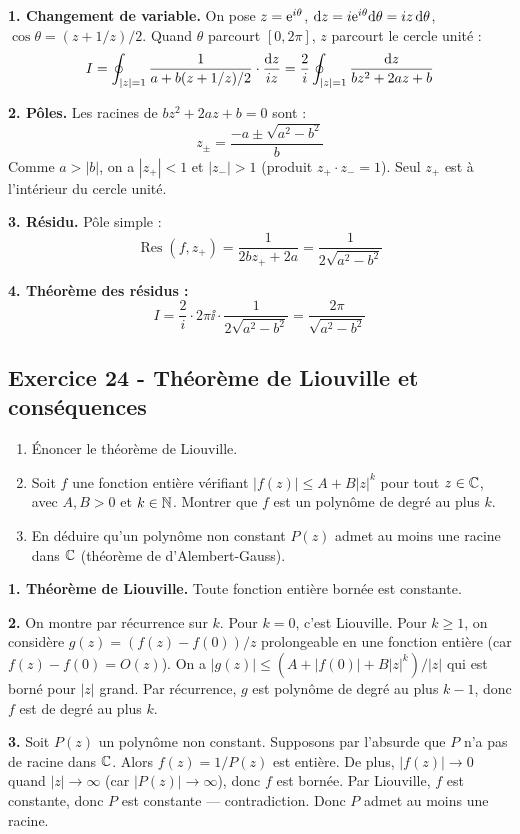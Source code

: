 \documentclass[12pt,a4paper]{article}
\begin{document}
\begin{boitecorrige}
\textbf{1. Changement de variable.} On pose $z = \mathrm{e}^{i\theta}$, $\mathrm{d} z = i\mathrm{e}^{i\theta}\mathrm{d}\theta = iz\,\mathrm{d}\theta$, $\cos\theta = (z+1/z)/2$. Quand $\theta$ parcourt $[0,2\pi]$, $z$ parcourt le cercle unité :
\[
I = \oint_{|z|=1}\frac{1}{a + b(z+1/z)/2}\cdot\frac{\mathrm{d} z}{iz} = \frac{2}{i}\oint_{|z|=1}\frac{\mathrm{d} z}{bz^2+2az+b}
\]

\textbf{2. Pôles.} Les racines de $bz^2+2az+b=0$ sont :
\[
z_\pm = \frac{-a\pm\sqrt{a^2-b^2}}{b}
\]
Comme $a>|b|$, on a $|z_+| < 1$ et $|z_-| > 1$ (produit $z_+\cdot z_- = 1$). Seul $z_+$ est à l'intérieur du cercle unité.

\textbf{3. Résidu.} Pôle simple :
\[
\operatorname{Res}(f, z_+) = \frac{1}{2bz_+ + 2a} = \frac{1}{2\sqrt{a^2-b^2}}
\]

\textbf{4. Théorème des résidus :}
\[
I = \frac{2}{i}\cdot 2\pi\ii \cdot \frac{1}{2\sqrt{a^2-b^2}} = \frac{2\pi}{\sqrt{a^2-b^2}}
\]
\end{boitecorrige}

\subsection*{Exercice 24 - Théorème de Liouville et conséquences \niveau{\moyen}}

\begin{boiteexercice}
\begin{enumerate}
  \item Énoncer le théorème de Liouville.
  \item Soit $f$ une fonction entière vérifiant $|f(z)|\leq A + B|z|^k$ pour tout $z\in\mathbb{C}$, avec $A,B>0$ et $k\in\mathbb{N}$. Montrer que $f$ est un polynôme de degré au plus $k$.
  \item En déduire qu'un polynôme non constant $P(z)$ admet au moins une racine dans $\mathbb{C}$ (théorème de d'Alembert-Gauss).
\end{enumerate}
\end{boiteexercice}

\begin{boitecorrige}
\textbf{1. Théorème de Liouville.} Toute fonction entière bornée est constante.

\textbf{2.} On montre par récurrence sur $k$. Pour $k=0$, c'est Liouville. Pour $k\geq 1$, on considère $g(z) = (f(z) - f(0))/z$ prolongeable en une fonction entière (car $f(z)-f(0) = O(z)$). On a $|g(z)| \leq (A+|f(0)|+B|z|^k)/|z|$ qui est borné pour $|z|$ grand. Par récurrence, $g$ est polynôme de degré au plus $k-1$, donc $f$ est de degré au plus $k$.

\textbf{3.} Soit $P(z)$ un polynôme non constant. Supposons par l'absurde que $P$ n'a pas de racine dans $\mathbb{C}$. Alors $f(z) = 1/P(z)$ est entière. De plus, $|f(z)|\to 0$ quand $|z|\to\infty$ (car $|P(z)|\to\infty$), donc $f$ est bornée. Par Liouville, $f$ est constante, donc $P$ est constante --- contradiction. Donc $P$ admet au moins une racine.
\end{boitecorrige}
\end{document}
